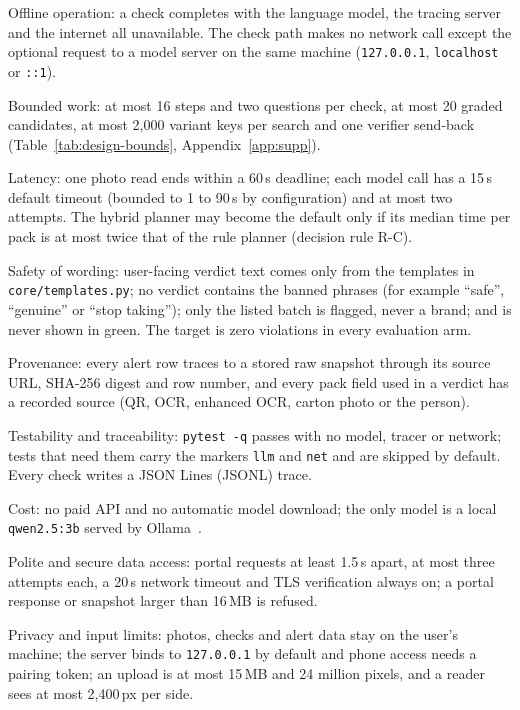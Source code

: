 \begin{description}[itemsep=1pt,font=\normalfont\bfseries]
\item[NFR1] Offline operation: a check completes with the language model, the tracing server and
the internet all unavailable. The check path makes no network call except the optional request to a
model server on the same machine (\texttt{127.0.0.1}, \texttt{localhost} or \texttt{::1}).
\item[NFR2] Bounded work: at most 16 steps and two questions per check, at most 20 graded
candidates, at most 2{,}000 variant keys per search and one verifier send-back
(Table~\ref{tab:design-bounds}, Appendix~\ref{app:supp}).
\item[NFR3] Latency: one photo read ends within a 60\,s deadline; each model call has a 15\,s
default timeout (bounded to 1 to 90\,s by configuration) and at most two attempts. The hybrid
planner may become the default only if its median time per pack is at most twice that of the rule
planner (decision rule R-C).
\item[NFR4] Safety of wording: user-facing verdict text comes only from the templates in
\texttt{core/templates.py}; no verdict contains the banned phrases (for example ``safe'',
``genuine'' or ``stop taking''); only the listed batch is flagged, never a brand; and \NLISTED{} is
never shown in green. The target is zero violations in every evaluation arm.
\item[NFR5] Provenance: every alert row traces to a stored raw snapshot through its source URL,
SHA-256 digest and row number, and every pack field used in a verdict has a recorded source (QR,
OCR, enhanced OCR, carton photo or the person).
\item[NFR6] Testability and traceability: \texttt{pytest -q} passes with no model, tracer or
network; tests that need them carry the markers \texttt{llm} and \texttt{net} and are skipped by
default. Every check writes a JSON Lines (JSONL) trace.
\item[NFR7] Cost: no paid API and no automatic model download; the only model is a local
\texttt{qwen2.5:3b} served by Ollama~\cite{ollama2026structured}.
\item[NFR8] Polite and secure data access: portal requests at least 1.5\,s apart, at most three
attempts each, a 20\,s network timeout and TLS verification always on; a portal response or
snapshot larger than 16\,MB is refused.
\item[NFR9] Privacy and input limits: photos, checks and alert data stay on the user's machine;
the server binds to \texttt{127.0.0.1} by default and phone access needs a pairing token; an
upload is at most 15\,MB and 24 million pixels, and a reader sees at most 2{,}400\,px per side.
\end{description}


